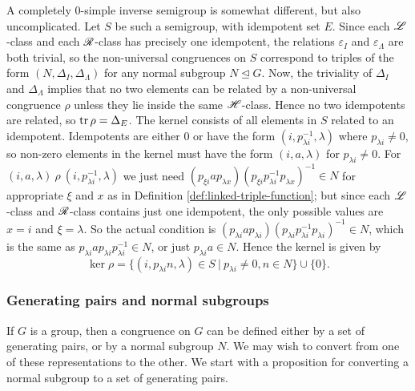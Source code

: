 A completely 0-simple inverse semigroup is somewhat different, but also
uncomplicated.  Let $S$ be such a semigroup, with idempotent set $E$.  Since
each $\mathrel{\mathscr{L}}$-class and each $\mathrel{\mathscr{R}}$-class has precisely one idempotent, the
relations $\varepsilon_I$ and $\varepsilon_\Lambda$ are both trivial, so the
non-universal congruences on $S$ correspond to triples of the form
$(N, \Delta_I, \Delta_\Lambda)$ for any normal subgroup $N \trianglelefteq G$.
Now, the triviality of $\Delta_I$ and $\Delta_\Lambda$ implies that no two
elements can be related by a non-universal congruence $\rho$ unless they lie
inside the same $\mathrel{\mathscr{H}}$-class.  Hence no two idempotents are related, so
$\operatorname{tr} \rho = \Delta_E$.  The kernel consists of all elements in $S$ related to an
idempotent.  Idempotents are either $0$ or have the form
$(i, p_{\lambda i}^{-1}, \lambda)$ where $p_{\lambda i} \neq 0$, so non-zero
elements in the kernel must have the form $(i, a, \lambda)$ for
$p_{\lambda i} \neq 0$.  For
$(i, a, \lambda) ~\rho~ (i, p_{\lambda i}^{-1}, \lambda)$ we just need
$(p_{\xi i} a p_{\lambda x}) (p_{\xi i} p_{\lambda i}^{-1} p_{\lambda x})^{-1}
\in N$
for appropriate $\xi$ and $x$ as in Definition \ref{def:linked-triple-function};
but since each $\mathrel{\mathscr{L}}$-class and $\mathrel{\mathscr{R}}$-class contains just one idempotent, the
only possible values are $x=i$ and $\xi=\lambda$.  So the actual condition is
$(p_{\lambda i} a p_{\lambda i}) (p_{\lambda i} p_{\lambda i}^{-1} p_{\lambda
  i})^{-1} \in N$,
which is the same as $p_{\lambda i} a p_{\lambda i} p_{\lambda i}^{-1} \in N$,
or just $p_{\lambda i} a \in N$.  Hence the kernel is given by
$$\ker \rho =
\{(i, p_{\lambda i}n, \lambda) \in S ~|~ p_{\lambda i} \neq 0, n \in N\}
\cup \{0\}.$$

\subsubsection{Generating pairs and normal subgroups}
If $G$ is a group, then a congruence on $G$ can be defined either by a set of
generating pairs, or by a normal subgroup $N$.  We may wish to convert from one
of these representations to the other.  We start with a proposition for
converting a normal subgroup to a set of generating pairs.

